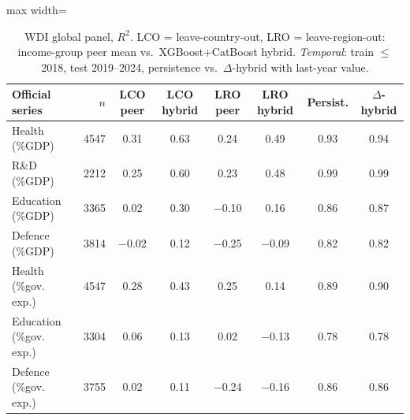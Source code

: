 \begin{table}
\caption{WDI global panel, $R^2$. LCO = leave-country-out, LRO = leave-region-out: income-group peer mean vs.\ XGBoost+CatBoost hybrid. \emph{Temporal}: train $\le$2018, test 2019--2024, persistence vs.\ $\Delta$-hybrid with last-year value.}\label{tab:B}
\centering\small
\renewcommand{\arraystretch}{1.1}
\begin{adjustbox}{max width=\linewidth}
\begin{tabular}{lrcccccc}
\toprule
Official series & $n$ & LCO peer & LCO hybrid & LRO peer & LRO hybrid & Persist. & $\Delta$-hybrid \\
\midrule
Health (\%GDP) & 4547 & 0.31 & 0.63 & 0.24 & 0.49 & 0.93 & 0.94 \\
R\&D (\%GDP) & 2212 & 0.25 & 0.60 & 0.23 & 0.48 & 0.99 & 0.99 \\
Education (\%GDP) & 3365 & 0.02 & 0.30 & $-$0.10 & 0.16 & 0.86 & 0.87 \\
Defence (\%GDP) & 3814 & $-$0.02 & 0.12 & $-$0.25 & $-$0.09 & 0.82 & 0.82 \\
Health (\%gov. exp.) & 4547 & 0.28 & 0.43 & 0.25 & 0.14 & 0.89 & 0.90 \\
Education (\%gov. exp.) & 3304 & 0.06 & 0.13 & 0.02 & $-$0.13 & 0.78 & 0.78 \\
Defence (\%gov. exp.) & 3755 & 0.02 & 0.11 & $-$0.24 & $-$0.16 & 0.86 & 0.86 \\
\bottomrule
\end{tabular}\end{adjustbox}
\end{table}
